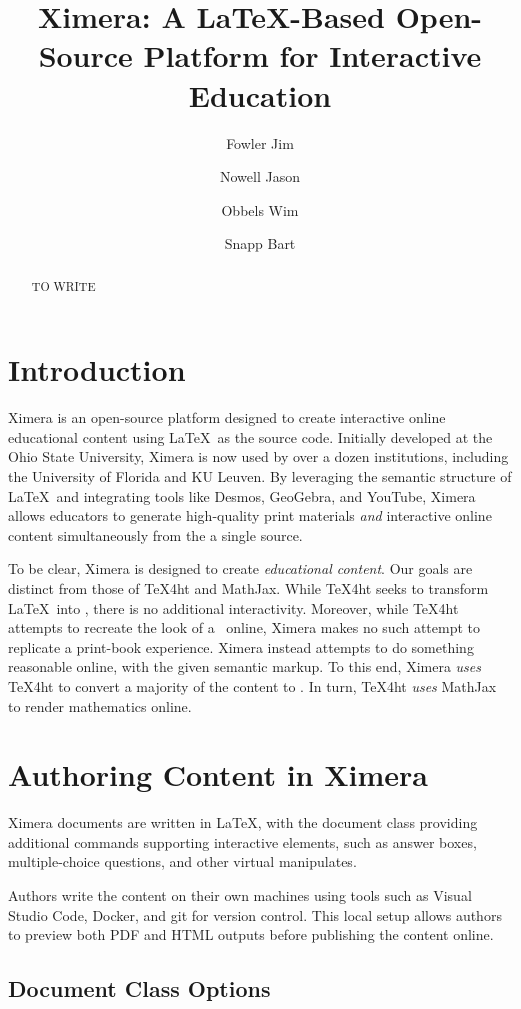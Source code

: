 \documentclass{ltugboat}
\title{Ximera: A \LaTeX{-}Based Open-Source Platform for Interactive
    Education}
\author{Fowler Jim}
\author{Nowell Jason}
\author{Obbels Wim}
\author{Snapp Bart}
\begin{document}
\maketitle

\begin{abstract}
    TO WRITE
\end{abstract}

\section{Introduction}

Ximera is an open-source platform designed to create interactive online
educational
content using \LaTeX\ as the source code. Initially developed at the Ohio State
University, Ximera is now used by over a dozen institutions, including
the University of Florida and KU Leuven. By leveraging the semantic structure
of \LaTeX\ and integrating tools like Desmos, GeoGebra, and YouTube, Ximera
allows educators to generate high-quality print materials \emph{and}
interactive online content simultaneously from the a single source.

To be clear, Ximera is designed to create \emph{educational content}. Our goals
are distinct from those of \TeX4ht and MathJax. While \TeX4ht seeks to
transform \LaTeX\ into \HTML, there is no additional interactivity. Moreover, while \TeX4ht attempts to recreate the look of a \PDF\ online, 
Ximera makes no such attempt to replicate a print-book experience. Ximera instead attempts to do something reasonable
online, with the given semantic markup. To this end, 
Ximera \emph{uses} \TeX4ht to convert a majority of the content to \HTML. In turn,
\TeX4ht \emph{uses} MathJax to render mathematics online.

\section{Authoring Content in Ximera}

Ximera documents are written in \LaTeX, with the document class providing additional 
 commands supporting interactive elements, such as answer boxes,
multiple-choice questions, and other virtual manipulates. 


Authors write the content on their own machines using tools such as Visual Studio Code, Docker, and git for
version control. This local setup allows authors to preview both PDF and HTML
outputs before publishing the content online.


\subsection{Document Class Options}
\end{document}
